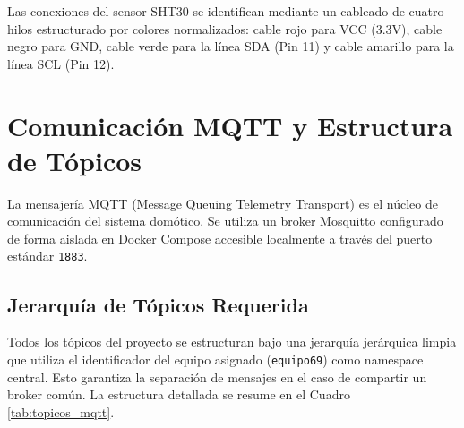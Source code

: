 \documentclass[12pt,letterpaper]{article}
\begin{document}
Las conexiones del sensor SHT30 se identifican mediante un cableado de cuatro hilos estructurado por colores normalizados: cable rojo para VCC (3.3V), cable negro para GND, cable verde para la línea SDA (Pin 11) y cable amarillo para la línea SCL (Pin 12).

\newpage
\section{Comunicación MQTT y Estructura de Tópicos}
La mensajería MQTT (Message Queuing Telemetry Transport) es el núcleo de comunicación del sistema domótico. Se utiliza un broker Mosquitto configurado de forma aislada en Docker Compose accesible localmente a través del puerto estándar \texttt{1883}.

\subsection{Jerarquía de Tópicos Requerida}
Todos los tópicos del proyecto se estructuran bajo una jerarquía jerárquica limpia que utiliza el identificador del equipo asignado (\texttt{equipo69}) como namespace central. Esto garantiza la separación de mensajes en el caso de compartir un broker común. La estructura detallada se resume en el Cuadro \ref{tab:topicos_mqtt}.
\end{document}
